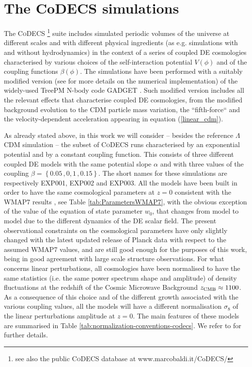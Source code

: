 \section{The CoDECS simulations}

The \textsc{CoDECS}%
\footnote{see also the public \textsc{CoDECS} database
at www.marcobaldi.it/CoDECS/%
} suite includes simulated periodic volumes of the universe at different
scales and with different physical ingredients (as e.g. simulations
with and without hydrodynamics) in the context of a series of coupled
DE cosmologies characterised by various choices of the self-interaction
potential $V(\phi)$ and of the coupling functions $\beta(\phi)$.
The simulations have been performed with a suitably modified version
(see \citep{baldi_codecs_2012} for more details on the numerical
implementation) of the widely-used TreePM N-body code  \textsc{GADGET}
\citep{springel_cosmological_2005}. Such modified version includes
all the relevant effects that characterise coupled DE cosmologies,
from the modified background evolution to the CDM particle mass variation,
the ``fifth-force`` and the velocity-dependent acceleration
appearing in equation (\ref{linear_cdm}).

As already stated above, in this work we will consider -- besides
the reference $\Lambda$CDM simulation -- the subset of \textsc{CoDECS}
runs characterised by an exponential potential and by a constant coupling
function. This consists of three different coupled DE models with
the same potential slope $\alpha$ and with three values of the coupling
$\beta=\left\{ 0.05\,,0,1\,,0.15\right\} $. The short names for these
simulations are respectively EXP001, EXP002 and EXP003. All the models
have been built in order to have the same cosmological parameters
at $z=0$ consistent with the WMAP7 results \citep{komatsu_seven-year_2010},
see Table \ref{tab:ParametersWMAP7}, with the obvious exception of
the value of the equation of state parameter $w_{0}$, that changes
from model to model due to the different dynamics of the DE scalar
field. The present observational constraints on the cosmological parameters
have only slightly changed with the latest updated release of Planck
data \citep{Planck:2015xua} with respect to the assumed WMAP7 values,
and are still good enough for the purposes of this work, being in
good agreement with large scale structure observations. For what concerns
linear perturbations, all cosmologies have been normalised to have
the same statistics (i.e. the same power spectrum shape and amplitude)
of density fluctuations at the redshift of the Cosmic Microwave Background
$z_{{\rm CMB}}\approx1100$. As a consequence of this choice and of
the different growth associated with the various coupling values,
all the models will have a different normalisation $\sigma_{8}$ of
the linear perturbations amplitude at $z=0$. The main features of
these models are summarised in Table \cref{tab:normalization-conventions-codecs}. We refer to
\citep{baldi_codecs_2012} for further details.

